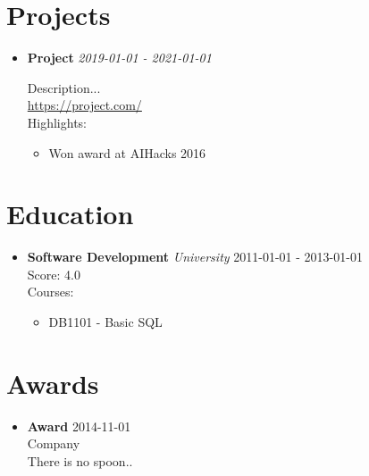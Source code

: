 \documentclass{article}
\newcommand{\entry}[2]{
    \textbf{#1} \hfill \textit{#2}
}
\begin{document}
\section*{Projects}
\begin{itemize}[leftmargin=*]
		
	\item \entry{Project}{2019-01-01 - 2021-01-01} 
	\vspace{0.1in}
	Description... \\
	\href{https://project.com/}{https://project.com/}\\
	Highlights:
	\begin{itemize}
				
				\item Won award at AIHacks 2016
					
		\end{itemize}
		\vspace{0.2in}
			
\end{itemize}
		

\section*{Education}
\begin{itemize}[leftmargin=*]
		
	\item \entry{Software Development}{University} \hfill 2011-01-01 - 2013-01-01 \\
				
		Score: 4.0\\
					
		Courses:
		\begin{itemize}
					
			\item DB1101 - Basic SQL
						\end{itemize}
	\end{itemize}
		

\section*{Awards}
\begin{itemize}[leftmargin=*]
		
	\item \textbf{Award} \hfill 2014-11-01\\
	Company \\
	There is no spoon..
				
\end{itemize}
		
\end{document}
